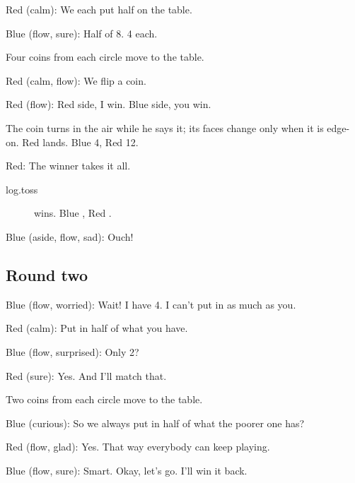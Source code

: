 
Red (calm): We each put half on the table.

Blue (flow, sure): Half of 8.
4 each.

Four coins from each circle move to the table.

Red (calm, flow): We flip a coin.

Red (flow): Red side, I win.
Blue side, you win.

The coin turns in the air while he says it; its faces change only when it
is edge-on. Red lands. Blue 4, Red 12.

Red: The winner takes it all.

\begin{description}
  \item[log.toss]  wins. Blue , Red .
\end{description}


Blue (aside, flow, sad): Ouch!

\subsection{Round two}\label{round2}

Blue (flow, worried): Wait!
I have 4.
I can't put in as much as you.

Red (calm): Put in half of what you have.

Blue (flow, surprised): Only 2?

Red (sure): Yes. And I'll match that.

Two coins from each circle move to the table.

Blue (curious): So we always put in half of what the poorer one has?

Red (flow, glad): Yes.
That way everybody can keep playing.

Blue (flow, sure): Smart.
Okay, let's go.
I'll win it back.

